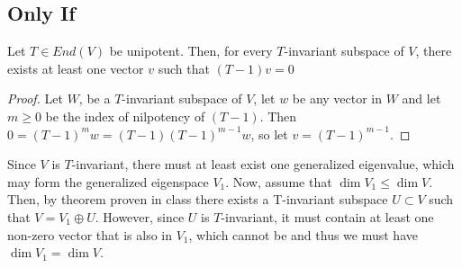 \subsection*{Only If}
\begin{lemma}
Let $T\in End(V)$ be unipotent. Then, for every $T$-invariant subspace of $V$, there exists at least one vector $v$ such that $(T-1)v=0$
\begin{proof}
Let $W$, be a $T$-invariant subspace of $V$, let $w$ be any vector in $W$ and let $m\geq 0$ be the index of nilpotency of $(T-1)$. Then $0=(T-1)^m w=(T-1) (T-1)^{m-1}  w$, so let $v= (T-1)^{m-1}$.
\end{proof}
\end{lemma}
Since $V$ is $T$-invariant, there must at least exist one generalized eigenvalue, which may form the generalized eigenspace $V_1$. Now, assume that $\dim V_1 \leq \dim V$. Then, by theorem proven in class there exists a T-invariant subspace $U\subset V$ such that $V=V_1\oplus U$. However, since $U$ is $T$-invariant, it must contain at least one non-zero vector that is also in $V_1$, which cannot be and thus we must have $\dim V_1 = \dim V$.
\begin{comment}
\begin{lemma}
\begin{lemma}
Let $L$ be any extension field of $K$. There does not exist any $a\in L$ s.t. $a\neq 0$, but $Tv=av$, for some $0\neq v\in V$ (where $V$ is seen as a subspace of a vector space $V_L$ over $L$ ). 
\begin{proof}
Since $T$ is unipotent, we must have $(T-1)^k=0$ for some $k$. The same must hold true when considering $T\in \End(V) \subset \End(V_L)$. Now assume that there did exist such an $a\neq 1$. Then for some $v\in V$, $T^n v = a^n v$. Therefore we must have $a=0$.
\end{proof}
\end{lemma}
\begin{lemma}
Any nilpotent linear transformation must have characteristic polynomial $X^n$
\begin{proof}
We know that the characteristic polynomial must be monic polynmial of degree $n=\dim V$ (as proven in class) and furthermore, we know that we may uniquely factor in into finitely many (since $\dim V \leq \infty$) irreducible polynomials of degree $\leq n$. Any eigenvalue in $K$ will correspond to a factor of $(X)$ so the only such factor is $(X-1)$, therefore
\[ p_char(X) = (X-1)^k q(X) \]
for some $0\leq k \leq n$, where $q$ is a polynomial that has no root over $K$. Assume that $q(X)\neq 1$. Then there exist finitely many irreducible factors $q_n(X)$ that also do not have a  root over $k$. 
Now, consider any of the $q_n(X)$ and consider the field $L=K[X]/q_n(X)$ as finite extension field of dimension $\dim q_n(X)$ as in a previous problem set. Now, clearly $p_char$ has a non-zero root over this extension field (given by $q_n(X)$)
\end{proof}
\end{lemma}
\end{comment}
